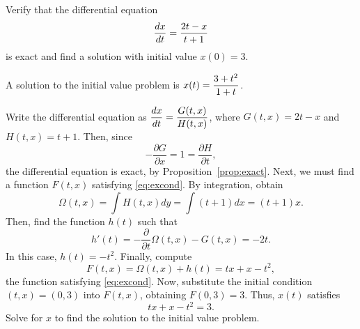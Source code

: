 \documentclass{ximera}
\begin{document}
\begin{exercise} \label{c14.6.4}
Verify that the differential equation 
\[
\displaystyle\frac{dx}{dt} = \displaystyle \frac{2t-x}{t+1} 
\]
is exact and find a solution with initial value $x(0) = 3$.

\begin{solution}
\ans A solution to the initial value problem is
$x(t) = \displaystyle\frac{3 + t^2}{1 + t}$.

\soln Write the differential equation as $\displaystyle\frac{dx}{dt} =
\frac{G(t,x)}{H(t,x)}$, where $G(t,x) = 2t - x$ and $H(t,x) = t + 1$.  Then,
since
\[
-\frac{\partial G}{\partial x} = 1 = \frac{\partial H}{\partial t},
\]
the differential equation is exact, by
Proposition~\ref{prop:exact}.  Next, we must find a function $F(t,x)$
satisfying \eqref{eq:excond}.  By integration, obtain
\[
\Omega(t,x) = \int H(t,x)dy = \int (t + 1)dx = (t + 1)x.
\]
Then, find the function $h(t)$ such that
\[
h'(t) = -\frac{\partial}{\partial t}\Omega(t,x) - G(t,x)
= -2t.
\]
In this case, $h(t) = -t^2$.  Finally, compute
\[
F(t,x) = \Omega(t,x) + h(t) = tx + x - t^2,
\]
the function satisfying \eqref{eq:excond}.  Now, substitute the initial
condition $(t,x) = (0,3)$ into $F(t,x)$, obtaining $F(0,3) = 3$.  Thus,
$x(t)$ satisfies
\[
tx + x - t^2 = 3.
\]
Solve for $x$ to find the solution to the initial value problem.

\end{solution}
\end{exercise}
\end{document}
